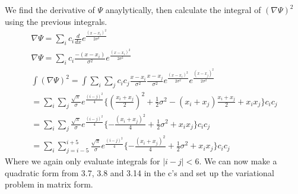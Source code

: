 \documentclass[a4paper,10pt]{article}
\numberwithin{equation}{section}
\begin{document}
We find the derivative of $\Psi$ anaylytically, then calculate the integral of $(\nabla \Psi)^2$ using the previous integrals.
\begin{gather}
\nabla \Psi= \sum_{i}c_i\frac{d}{dx}e^{\frac{(x-x_i)^2}{2\sigma ^2}}\\
\nabla \Psi=\sum_{i}c_i\frac{-(x-x_i)}{\sigma ^2}e^{\frac{(x-x_i)^2}{2\sigma ^2}}\\
\int (\nabla \Psi)^2 = \int \sum_{i}\sum_{j}c_ic_j\frac{x-x_i}{\sigma ^2}\frac{x-x_j}{\sigma ^2}
  e^{\frac{(x-x_i)^2}{2\sigma ^2}}e^{\frac{(x-x_j)^2}{2\sigma ^2}}\\
  =\sum_{i}\sum_{j}\frac{\sqrt{\pi}}{\sigma}e^{\frac{(i-j)^2}{4}}\{(\frac{x_i+x_j}{2})^2+\frac{1}{2}\sigma ^2
  -(x_i+x_j)\frac{x_i+x_j}{2}
  +x_ix_j\}c_ic_j\\
  =\sum_{i}\sum_{j}\frac{\sqrt{\pi}}{\sigma}e^{\frac{(i-j)^2}{4}}\{-\frac{(x_i+x_j)^2}{4}+\frac{1}{2}\sigma ^2+x_ix_j\}c_ic_j\\
  =\sum_{i}\sum_{j=i-5}^{i+5}\frac{\sqrt{\pi}}{\sigma}e^{\frac{(i-j)^2}{4}}\{-\frac{(x_i+x_j)^2}{4}+\frac{1}{2}\sigma ^2+x_ix_j\}c_ic_j
\end{gather}
Where we again only evaluate integrals for  $|i-j|<6$.
We can now make a quadratic form from 3.7, 3.8 and 3.14 in the c's and set up the variational problem in matrix form.
\end{document}
